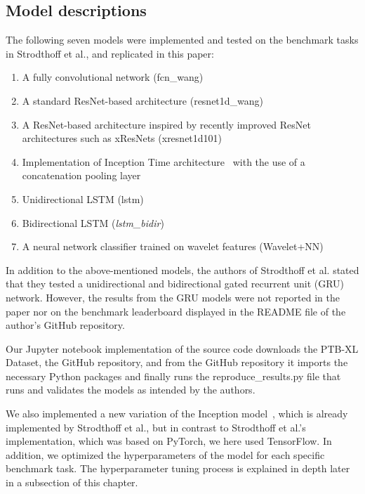 \subsection{Model descriptions}

The following seven models were implemented and tested on the benchmark tasks in Strodthoff et al., and replicated in this paper:
\begin{enumerate}[noitemsep,topsep=1pt]
    \item A fully convolutional network (fcn\_wang)~\cite{wang_time_2017}
    \item A standard ResNet-based architecture (resnet1d\_wang)~\cite{wang_time_2017, he_deep_2016}
    \item A ResNet-based architecture inspired by recently improved ResNet architectures such as xResNets (xresnet1d101)~\cite{he_bag_2019}
    \item Implementation of Inception Time architecture~\cite{ismail_fawaz_et_al_inceptiontime_2020} with the use of a concatenation pooling layer 
    \item Unidirectional LSTM (lstm)~\cite{hochreiter_long_1997}
    \item Bidirectional LSTM (\textit{lstm\_bidir})~\cite{hochreiter_long_1997}
    \item A neural network classifier trained on wavelet features (Wavelet+NN) ~\cite{sharma_inferior_2018}\newline
\end{enumerate}

In addition to the above-mentioned models, the authors of Strodthoff et al. stated that they tested a unidirectional and bidirectional gated recurrent unit (GRU) network. However, the results from the GRU models were not reported in the paper nor on the benchmark leaderboard displayed in the README file of the author's GitHub repository. 

Our Jupyter notebook implementation of the source code downloads the PTB-XL Dataset, the GitHub repository, and from the GitHub repository it imports the necessary Python packages and finally runs the reproduce\_results.py file that runs and validates the models as intended by the authors.

We also implemented a new variation of the Inception model~\cite{ismail_fawaz_et_al_inceptiontime_2020}, which is already implemented by Strodthoff et al., but in contrast to Strodthoff et al.'s implementation, which was based on PyTorch, we here used TensorFlow. In addition, we optimized the hyperparameters of the model for each specific benchmark task. The hyperparameter tuning process is explained in depth later in a subsection of this chapter.

